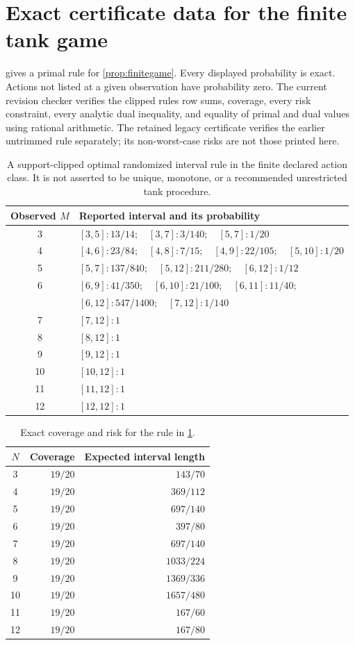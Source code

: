 \documentclass[11pt]{article}
\numberwithin{equation}{section}
\theoremstyle{definition}
\theoremstyle{remark}
\begin{document}
\section{Exact certificate data for the finite tank game}\label{app:certificate}
 gives a primal rule for \cref{prop:finitegame}. Every displayed probability is exact. Actions not listed at a given observation have probability zero. The current revision checker verifies the clipped rule\textquotesingle s row sums, coverage, every risk constraint, every analytic dual inequality, and equality of primal and dual values using rational arithmetic. The retained legacy certificate verifies the earlier untrimmed rule separately; its non-worst-case risks are not those printed here.
\begin{table}[ht]
\centering\small
\begin{tabular}{cl}
\toprule
Observed $M$ & Reported interval and its probability\\
\midrule
3 & $[3,5]:13/14;\quad [3,7]:3/140;\quad [5,7]:1/20$\\
4 & $[4,6]:23/84;\quad [4,8]:7/15;\quad [4,9]:22/105;\quad [5,10]:1/20$\\
5 & $[5,7]:137/840;\quad [5,12]:211/280;\quad [6,12]:1/12$\\
6 & $[6,9]:41/350;\quad [6,10]:21/100;\quad [6,11]:11/40;$\\
  & $[6,12]:547/1400;\quad [7,12]:1/140$\\
7 & $[7,12]:1$\\
8 & $[8,12]:1$\\
9 & $[9,12]:1$\\
10 & $[10,12]:1$\\
11 & $[11,12]:1$\\
12 & $[12,12]:1$\\
\bottomrule
\end{tabular}
\caption{A support-clipped optimal randomized interval rule in the finite declared action class. It is not asserted to be unique, monotone, or a recommended unrestricted tank procedure.}\label{tab:rule}
\end{table}

\begin{table}[ht]
\centering\small
\begin{tabular}{crr}
\toprule
$N$ & Coverage & Expected interval length\\
\midrule
3 & $19/20$ & $143/70$\\
4 & $19/20$ & $369/112$\\
5 & $19/20$ & $697/140$\\
6 & $19/20$ & $397/80$\\
7 & $19/20$ & $697/140$\\
8 & $19/20$ & $1033/224$\\
9 & $19/20$ & $1369/336$\\
10 & $19/20$ & $1657/480$\\
11 & $19/20$ & $167/60$\\
12 & $19/20$ & $167/80$\\
\bottomrule
\end{tabular}
\caption{Exact coverage and risk for the rule in \cref{tab:rule}.}\label{tab:risks}
\end{table}
\clearpage
\end{document}
